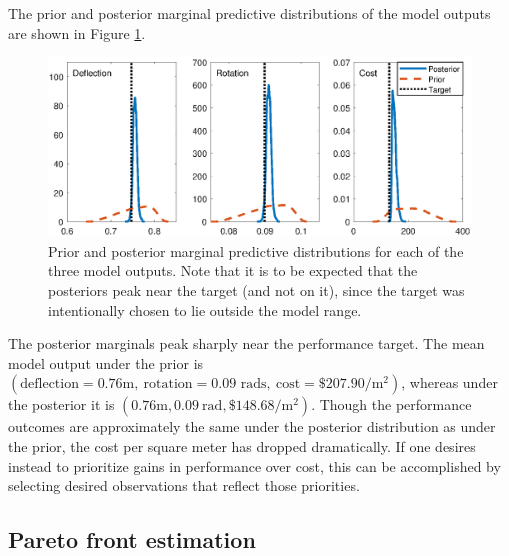 \documentclass[12pt]{article}
\begin{document}
%
The prior and posterior marginal predictive distributions of the model outputs are shown in Figure \ref{fig:prior_post_pred_comp}.
%
\begin{figure}
\centering
\includegraphics[scale=0.8]{FIG_prior_vs_posterior_dist}
\caption{Prior and posterior marginal predictive distributions for each of the three model outputs. Note that it is to be expected that the posteriors peak near the target (and not on it), since the target was intentionally chosen to lie outside the model range.}
\label{fig:prior_post_pred_comp}
\end{figure}
%
The posterior marginals peak sharply near the performance target.
%
The mean model output under the prior is $(\text{deflection}=0.76\mathrm m,\ \text{rotation}=0.09\text{ rads},\ \text{cost}=\$207.90/\mathrm m^2)$, whereas under the posterior it is $(0.76\mathrm m,0.09\ \mathrm{rad},\$148.68/\mathrm m^2)$.
%
Though the performance outcomes are approximately the same under the posterior distribution as under the prior, the cost per square meter has dropped dramatically.
%
If one desires instead to prioritize gains in performance over cost, this can be accomplished by selecting desired observations that reflect those priorities. 

\subsection{Pareto front estimation}\label{removing_cal_pars}

\end{document}
